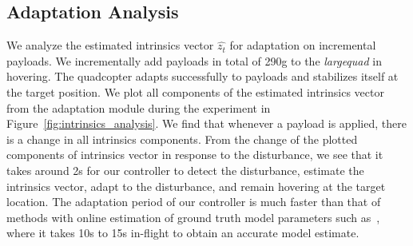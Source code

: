 

\subsection{Adaptation Analysis}
We analyze the estimated intrinsics vector $\hat{z_t}$ for adaptation on incremental payloads. We incrementally add payloads in total of 290g to the \emph{largequad} in hovering. The quadcopter adapts successfully to payloads and stabilizes itself at the target position. 
%
We plot all components of the estimated intrinsics vector from the adaptation module during the experiment in Figure~\ref{fig:intrinsics_analysis}. 
%
We find that whenever a payload is applied, there is a change in all intrinsics components. 
%
%
From the change of the plotted components of intrinsics vector in response to the disturbance, we see that it takes around 2s for our controller to detect the disturbance, estimate the intrinsics vector, adapt to the disturbance, and remain hovering at the target location. 
%
The adaptation period of our controller is much faster than that of methods with online estimation of ground truth model parameters such as~\cite{wuest2019online}, where it takes 10s to 15s in-flight to obtain an accurate model estimate.
